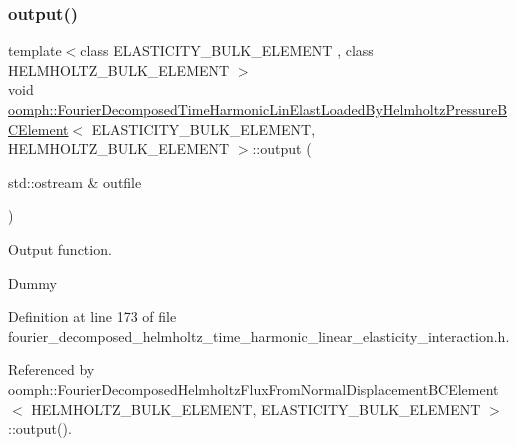 \subsubsection{\texorpdfstring{output()}{output()}\hspace{0.1cm}{\footnotesize\ttfamily [1/4]}}
{\footnotesize\ttfamily template$<$class E\+L\+A\+S\+T\+I\+C\+I\+T\+Y\+\_\+\+B\+U\+L\+K\+\_\+\+E\+L\+E\+M\+E\+NT , class H\+E\+L\+M\+H\+O\+L\+T\+Z\+\_\+\+B\+U\+L\+K\+\_\+\+E\+L\+E\+M\+E\+NT $>$ \\
void \hyperlink{classoomph_1_1FourierDecomposedTimeHarmonicLinElastLoadedByHelmholtzPressureBCElement}{oomph\+::\+Fourier\+Decomposed\+Time\+Harmonic\+Lin\+Elast\+Loaded\+By\+Helmholtz\+Pressure\+B\+C\+Element}$<$ E\+L\+A\+S\+T\+I\+C\+I\+T\+Y\+\_\+\+B\+U\+L\+K\+\_\+\+E\+L\+E\+M\+E\+NT, H\+E\+L\+M\+H\+O\+L\+T\+Z\+\_\+\+B\+U\+L\+K\+\_\+\+E\+L\+E\+M\+E\+NT $>$\+::output (\begin{DoxyParamCaption}\item[{std\+::ostream \&}]{outfile }\end{DoxyParamCaption})\hspace{0.3cm}{\ttfamily [inline]}}



Output function. 

Dummy 

Definition at line 173 of file fourier\+\_\+decomposed\+\_\+helmholtz\+\_\+time\+\_\+harmonic\+\_\+linear\+\_\+elasticity\+\_\+interaction.\+h.



Referenced by oomph\+::\+Fourier\+Decomposed\+Helmholtz\+Flux\+From\+Normal\+Displacement\+B\+C\+Element$<$ H\+E\+L\+M\+H\+O\+L\+T\+Z\+\_\+\+B\+U\+L\+K\+\_\+\+E\+L\+E\+M\+E\+N\+T, E\+L\+A\+S\+T\+I\+C\+I\+T\+Y\+\_\+\+B\+U\+L\+K\+\_\+\+E\+L\+E\+M\+E\+N\+T $>$\+::output().

\mbox{\label{classoomph_1_1FourierDecomposedTimeHarmonicLinElastLoadedByHelmholtzPressureBCElement_a2c55e922cbc2a9f901356a47f696c0d6}} 
